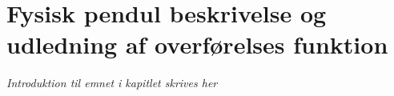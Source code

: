 \chapter{Fysisk pendul beskrivelse og udledning af overførelses funktion}\label{kap:chap_fysik_reg}

\emph{Introduktion til emnet i kapitlet skrives her}